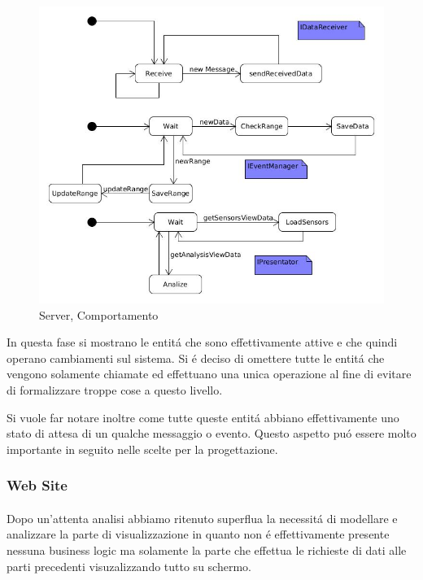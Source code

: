 \begin{figure}[h]
\centering
\includegraphics[width=\textwidth]{Figures/DomainModel/Server/Behaviour}
\caption{Server, Comportamento}
\end{figure}


In questa fase si mostrano le entit\'a che sono effettivamente attive e che quindi operano cambiamenti sul sistema. Si \'e deciso di omettere tutte le entit\'a che vengono solamente chiamate ed effettuano una unica operazione al fine di evitare di formalizzare troppe cose a questo livello.

Si vuole far notare inoltre come tutte queste entit\'a abbiano effettivamente uno stato di attesa di un qualche messaggio o evento. Questo aspetto pu\'o essere molto importante in seguito nelle scelte per la progettazione.

\newpage

\subsubsection{Web Site}

\paragraph{}Dopo un'attenta analisi abbiamo ritenuto superflua la necessit\'a di modellare e analizzare la parte di visualizzazione in quanto non \'e effettivamente presente nessuna business logic ma solamente la parte che effettua le richieste di dati alle parti precedenti visuzalizzando tutto su schermo.

